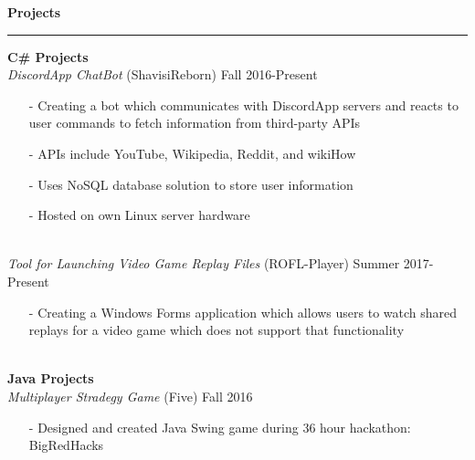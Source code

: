\documentclass[11pt]{article}
\newcommand{\Hrule}{\vspace{1mm}\hrule\vspace{1mm}}
\newcommand{\Indent}{\indent\indent}
\begin{document}
    \noindent\large\textbf{Projects}
    \Hrule
        \indent \small\textbf{C\# Projects}\\
            \Indent \small\textit{DiscordApp ChatBot}\small{ (ShavisiReborn)} \hfill \small{Fall 2016-Present}\indent\\
                \Indent\begin{minipage}{\dimexpr\textwidth-6cm}
                    \begin{itemize}[noitemsep, topsep=0pt]
                        \item[-] Creating a bot which communicates with DiscordApp servers and reacts to user commands to fetch information from third-party APIs
                        \item[-] APIs include YouTube, Wikipedia, Reddit, and wikiHow
                        \item[-] Uses NoSQL database solution to store user information
                        \item[-] Hosted on own Linux server hardware
                    \end{itemize}\vspace{0mm}
                \end{minipage}\\
            \Indent \small\textit{Tool for Launching Video Game Replay Files}\small{ (ROFL-Player)} \hfill \small{Summer 2017-Present}\indent\vspace{0.5mm}\\
                \Indent\begin{minipage}{\dimexpr\textwidth-6cm}
                    \begin{itemize}[noitemsep, topsep=0pt]
                        \item[-] Creating a Windows Forms application which allows users to watch shared replays for a video game which does not support that functionality
                    \end{itemize}\vspace{0mm}
                \end{minipage}\\
        \indent \small\textbf{Java Projects}\\
            \Indent \small\textit{Multiplayer Stradegy Game}\small{ (Five)} \hfill \small{Fall 2016}\indent\vspace{0.5mm}\\
                \Indent\begin{minipage}{\dimexpr\textwidth-6cm}
                    \begin{itemize}[noitemsep, topsep=0pt]
                        \item[-] Designed and created Java Swing game during 36 hour hackathon: BigRedHacks
                    \end{itemize}\vspace{0mm}
                \end{minipage}\\
\end{document}
